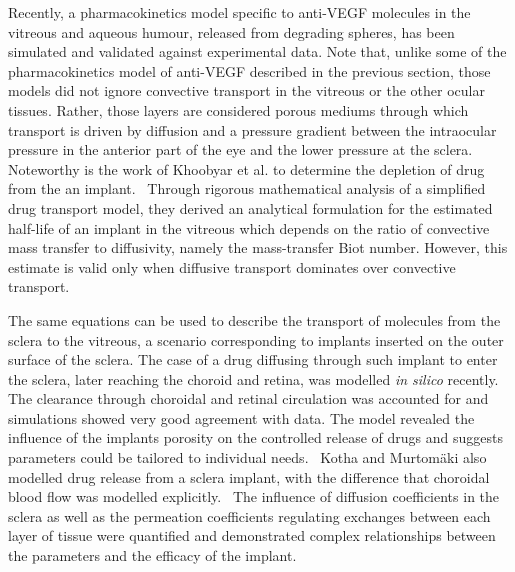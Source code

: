 \documentclass{article}
\begin{document}
Recently, a pharmacokinetics model specific to anti-VEGF molecules in the vitreous and aqueous humour, released from degrading spheres, has been simulated and validated against experimental data.\cite{Heljak_2022}
Note that, unlike some of the pharmacokinetics model of anti-VEGF described in the previous section, those models did not ignore convective transport in the vitreous or the other ocular tissues.
Rather, those layers are considered porous mediums through which transport is driven by diffusion and a pressure gradient between the intraocular pressure in the anterior part of the eye and the lower pressure at the sclera.~\cite{Ferreira_2018,Ferreira_2020,Heljak_2022,Khoobyar_2021,Li_2022a}
Noteworthy is the work of Khoobyar et al. to determine the depletion of drug from the an implant.~\cite{Khoobyar_2022}
Through rigorous mathematical analysis of a simplified drug transport model, they derived an analytical formulation for the estimated half-life of an implant in the vitreous which depends on the ratio of convective mass transfer to diffusivity, namely the mass-transfer Biot number.
However, this estimate is valid only when diffusive transport dominates over convective transport.



The same equations can be used to describe the transport of molecules from the sclera to the vitreous, a scenario corresponding to implants inserted on the outer surface of the sclera.
The case of a drug diffusing through such implant to enter the sclera, later reaching the choroid and retina, was modelled \textit{in silico} recently.~\cite{Abootorabi_2021}
The clearance through choroidal and retinal circulation was accounted for and simulations showed very good agreement with data.
The model revealed the influence of the implants porosity on the controlled release of drugs and suggests parameters could be tailored to individual needs.~\cite{Abootorabi_2021}
Kotha and Murtom\"aki also modelled drug release from a sclera implant, with the difference that choroidal blood flow was modelled explicitly.~\cite{Kotha_2014}
The influence of diffusion coefficients in the sclera as well as the permeation coefficients regulating exchanges between each layer of tissue were quantified and demonstrated complex relationships between the parameters and the efficacy of the implant.
\end{document}

